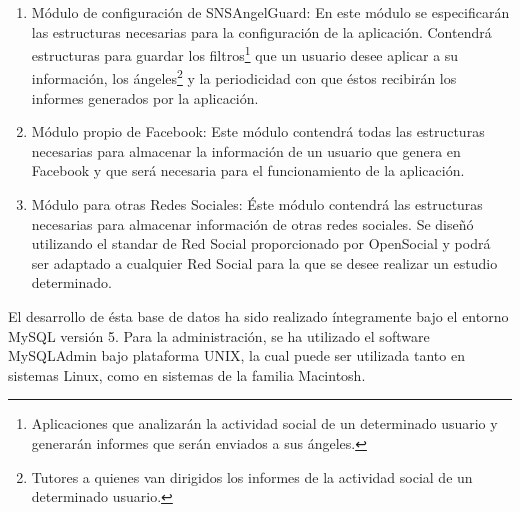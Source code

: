 \begin{enumerate}
\item Módulo de configuración de SNSAngelGuard: En este módulo se especificarán las estructuras necesarias para la configuración de la aplicación. Contendrá estructuras para guardar los filtros\footnote[1]{Aplicaciones que analizarán la actividad social de un determinado usuario y generarán informes que serán enviados a sus ángeles.} que un usuario desee aplicar a su información, los ángeles\footnote[2]{Tutores a quienes van dirigidos los informes de la actividad social de un determinado usuario.} y la periodicidad con que éstos recibirán los informes generados por la aplicación.
\item Módulo propio de Facebook: Este módulo contendrá todas las estructuras necesarias para almacenar la información de un usuario que genera en Facebook y que será necesaria para el funcionamiento de la aplicación.
\item Módulo para otras Redes Sociales: Éste módulo contendrá las estructuras necesarias para almacenar información de otras redes sociales. Se diseñó utilizando el standar de Red Social proporcionado por OpenSocial y podrá ser adaptado a cualquier Red Social para la que se desee realizar un estudio determinado.
\end{enumerate}
\bigskip
\par
El desarrollo de ésta base de datos ha sido realizado íntegramente bajo el entorno MySQL versión 5. Para la administración, se ha utilizado el software MySQLAdmin bajo plataforma UNIX, la cual puede ser utilizada tanto en sistemas Linux, como en sistemas de la familia Macintosh.



